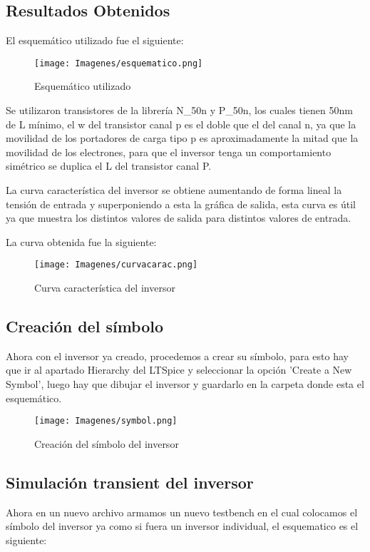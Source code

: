 \documentclass[11pt, a4paper]{article}
\begin{document}
\subsection{Resultados Obtenidos}
El esquemático utilizado fue el siguiente:
   \begin{figure}[H]
    \centering
    \texttt{[image: Imagenes/esquematico.png]}
    \caption{Esquemático utilizado}
    \label{fig:esquematico}
    \end{figure}

 Se utilizaron transistores de la librería N\_50n y P\_50n, los cuales tienen 50nm de L mínimo, el w del transistor canal p es el doble que el del canal n, ya que la movilidad de los portadores de carga tipo p es aproximadamente la mitad que la movilidad de los electrones, para que el inversor tenga un comportamiento simétrico se duplica el L del transistor canal P.
 
La curva característica del inversor se obtiene aumentando de forma lineal la tensión de entrada y superponiendo a esta la gráfica de salida, esta curva es útil ya que muestra los distintos valores de salida para distintos valores de entrada.

La curva obtenida fue la siguiente:


   \begin{figure}[H]
    \centering
    \texttt{[image: Imagenes/curvacarac.png]}
    \caption{Curva característica del inversor}
    \label{fig:curvacarac}
    \end{figure}
\subsection{Creación del símbolo}

Ahora con el inversor ya creado, procedemos a crear su símbolo, para esto hay que ir al apartado Hierarchy del LTSpice y seleccionar la opción 'Create a New Symbol', luego hay que dibujar el inversor y guardarlo en la carpeta donde esta el esquemático.

   \begin{figure}[H]
    \centering
    \texttt{[image: Imagenes/symbol.png]}
    \caption{Creación del símbolo del inversor}
    \label{fig:symbol}
    \end{figure}

\subsection{Simulación transient del inversor}
Ahora en un nuevo archivo armamos un nuevo testbench en el cual colocamos el símbolo del inversor ya como si fuera un inversor individual, el esquematico es el siguiente:
\end{document}
